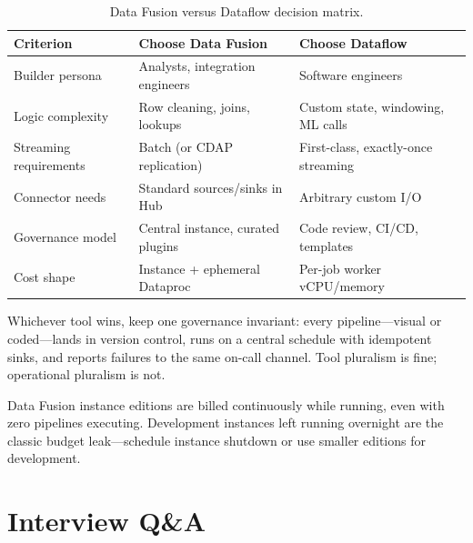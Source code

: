 \begin{table}[H]
\centering
\small
\begin{tabular}{@{}p{4.0cm}p{4.4cm}p{4.4cm}@{}} \\
\toprule
\textbf{Criterion} & \textbf{Choose Data Fusion} & \textbf{Choose Dataflow} \\
\midrule
Builder persona & Analysts, integration engineers & Software engineers \\
Logic complexity & Row cleaning, joins, lookups & Custom state, windowing, ML calls \\
Streaming requirements & Batch (or CDAP replication) & First-class, exactly-once streaming \\
Connector needs & Standard sources/sinks in Hub & Arbitrary custom I/O \\
Governance model & Central instance, curated plugins & Code review, CI/CD, templates \\
Cost shape & Instance + ephemeral Dataproc & Per-job worker vCPU/memory \\
\bottomrule
\end{tabular}
\caption{Data Fusion versus Dataflow decision matrix.}
\label{tab:ch10-fusion-vs-dataflow}
\end{table}

\begin{tipbox}
Whichever tool wins, keep one governance invariant: every pipeline---visual or coded---lands in version control, runs on a central schedule with idempotent sinks, and reports failures to the same on-call channel. Tool pluralism is fine; operational pluralism is not.
\end{tipbox}

\begin{pitfall}
Data Fusion instance editions are billed continuously while running, even with zero pipelines executing. Development instances left running overnight are the classic budget leak---schedule instance shutdown or use smaller editions for development.
\end{pitfall}

\section{Interview Q\&A}
